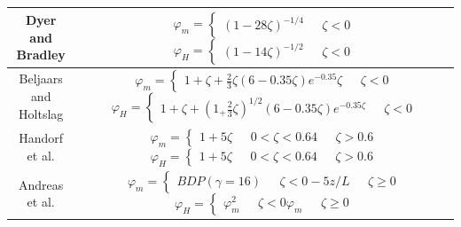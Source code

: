 {\begin{table}[p]
\begin{tabular}{| c | c |}
               \hline
        \shortstack{Dyer and \\ Bradley \\ \citep{dyer:1982}}  & \shortstack{$\varphi_{m} = \begin{cases} (1 - 28\zeta)^{-1/4} & \text{    } \zeta < 0 \\ \end{cases}$\\$\varphi_{H} = \begin{cases} (1 - 14\zeta)^{-1/2} & \text{    } \zeta < 0 \\ \end{cases}$ } \\ 
                \hline
        \shortstack{Beljaars and \\ Holtslag \\ \citep{beljaars:1991}}  & \shortstack{$\varphi_{m} = \begin{cases} 1 + \zeta + \frac{2}{3} \zeta (6 - 0.35 \zeta) e^{-0.35} \zeta & \text{    } \zeta < 0 \\ \end{cases}$\\$\varphi_{H} = \begin{cases} 1 + \zeta + (1_+ \frac{2}{3} \zeta)^{1/2} (6 - 0.35 \zeta) e^{-0.35 \zeta} & \text{    } \zeta < 0 \\ \end{cases}$ } \\ 
                \hline
        \shortstack{Handorf et al. \\ \citep{handorf:1999}} & \shortstack{$\varphi_{m} = \begin{cases} 1 + 5 \zeta & \text{    } 0 < \zeta < 0.6 \\ 4 & \text{    } \zeta > 0.6 \\ \end{cases}$\\$\varphi_{H} = \begin{cases} 1 + 5 \zeta & \text{    } 0 < \zeta < 0.6 \\ 4 & \text{    } \zeta > 0.6 \\ \end{cases}$ } \\ 
              \hline
       \shortstack{Andreas et al. \\ \citep{andreas:2009}} & \shortstack{$\varphi_{m} = \begin{cases} BDP(\gamma = 16) & \text{    } \zeta < 0 \\ -5z/L & \text{    } \zeta \geq 0 \\ \end{cases}$ \\ $\varphi_{H} = \begin{cases} \varphi_{m}^{2} & \text{    } \zeta < 0 \\ \varphi_{m} & \text{    } \zeta \geq 0 \\ \end{cases}$ } \\ 

\end{tabular}
\end{table}}
